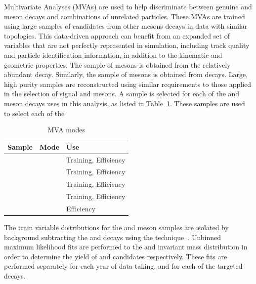 Multivariate Analyses (MVAs) are used to help discriminate between genuine \Dsp and \phiz meson decays and combinations of unrelated particles. 
These MVAs are trained using large samples of candidates from other \B mesons decays in data with similar topologies. 
This data-driven approach can benefit from an expanded set of variables that are not perfectly represented in simulation, including track quality and particle identification information, in addition to the kinematic and geometric properties.
The sample of \Dsp mesons is obtained from the relatively abundant \decay{\Bsb}{\Dsp\pim} decay. Similarly, the sample of \phiz mesons is obtained from \decay{\Bs}{\jpsi\phiz} decays. Large, high purity samples are reconstructed using similar requirements to those applied in the selection of signal \Dsp and \phiz mesons.
A sample is selected for each of the \Dsp and \phiz meson decays uses in this analysis, as listed in Table~\ref{tab:mva_modes}. 
These samples are used to select each of the 

\begin{table}[t]
 \caption{MVA modes}
\begin{center}\begin{tabular}{lll}
   \hline
   Sample                    & Mode                       & Use \\ 
   \hline
   \decay{\Bsb}{\Dsp\pim}    & \decay{\Dsp}{\Kp\Km\pip}   & Training, Efficiency \\
   \decay{\Bsb}{\Dsp\pim}    & \decay{\Dsp}{\Kp\pim\pip}  & Training, Efficiency \\
   \decay{\Bsb}{\Dsp\pim}    & \decay{\Dsp}{\pip\pim\pip} & Training, Efficiency \\
   \decay{\Bs}{\jpsi\phiz}   & \decay{\phiz}{\Kp\Km}      & Training, Efficiency \\
   \hline
   \decay{\Bp}{\Dzb\pip}     & \decay{\Dzb}{\Kp\Km}       & Efficiency          \\
   \hline
 \end{tabular}\end{center}
\label{tab:mva_modes}
\end{table}


The train variable distributions for the \Dsp and \phiz meson samples are isolated by background subtracting the \decay{\Bs}{\jpsi\phiz} and \decay{\Bsb}{\Dsp\pim} decays using the \sPlot technique~\cite{Pivk:2004ty}. Unbinned maximum likelihood fits are performed to the \Dsp and \phiz invariant mass distribution in order to determine the yield of \Dsp and \phiz candidates respectively. These fits are performed separately for each year of data taking, and for each of the targeted decays. 

